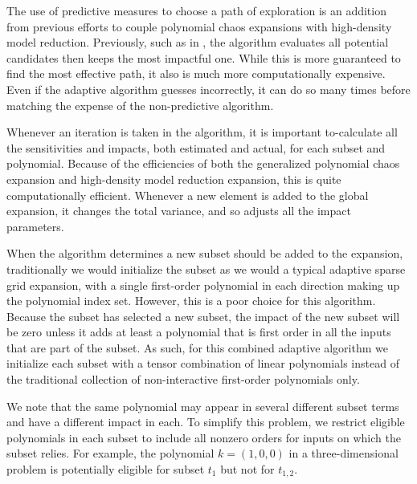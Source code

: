 The use of predictive measures to choose a path of exploration is an addition from previous efforts to couple
polynomial chaos expansions with high-density model reduction.  Previously, such as in \cite{Gerstner}, the
algorithm evaluates all potential candidates then keeps the most impactful one.  While this is more guaranteed
to find the most effective path, it also is much more computationally expensive.  Even if the adaptive
algorithm guesses incorrectly, it can do so many times before matching the expense of the non-predictive
algorithm.

Whenever an iteration is taken in the algorithm, it is important to-calculate all the sensitivities and
impacts, both estimated and actual, for each subset and polynomial.  Because of the efficiencies of both the
generalized polynomial chaos expansion and high-density model reduction expansion, this is quite
computationally efficient.  Whenever a new element is added to the global expansion, it changes the total
variance, and so adjusts all the impact parameters.

When the algorithm determines a new subset should be added to the expansion, traditionally we would initialize
the subset as we would a typical adaptive sparse grid expansion, with a single first-order polynomial in each
direction making up the polynomial index set.  However, this is a poor choice for this algorithm.  Because the
subset has selected a new subset, the impact of the new subset will be zero unless it adds at least a
polynomial that is first order in all the inputs that are part of the subset.  As such, for this combined
adaptive algorithm we initialize each subset with a tensor combination of linear polynomials instead of the
traditional collection of non-interactive first-order polynomials only.

 \label{sec: one poly per subset}
We note that the same polynomial may appear in several different subset terms and have a
different impact in each.  To simplify this problem, we restrict eligible polynomials in each subset to
include all nonzero orders for inputs on which the subset relies.  For example, the polynomial $k=(1,0,0)$ in
a three-dimensional problem is potentially eligible for subset $t_1$ but not for $t_{1,2}$.

